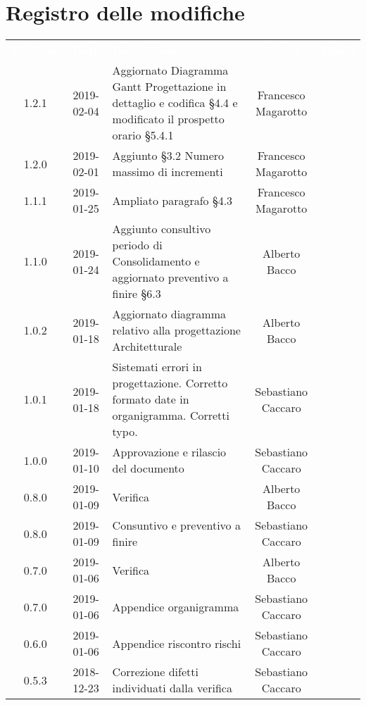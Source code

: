 \section*{Registro delle modifiche}
{
	\renewcommand{\arraystretch}{1.5}
	\centering
	\begin{longtable}{ c c  C{4cm}  c  c }
		
		\textcolor{white}{\textbf{Versione}} & \textcolor{white}{\textbf{Data}} & \textcolor{white}{\textbf{Descrizione}} & \textcolor{white}{\textbf{Autore}} & \textcolor{white}{\textbf{Ruolo}}\\
		1.2.1 & 2019-02-04 & Aggiornato Diagramma Gantt Progettazione in dettaglio e codifica §4.4 e modificato il prospetto orario §5.4.1 & Francesco Magarotto & \reda{}\\
		1.2.0 & 2019-02-01 & Aggiunto §3.2 Numero massimo di incrementi & Francesco Magarotto & \reda{}\\
		1.1.1 & 2019-01-25 & Ampliato paragrafo §4.3 & Francesco Magarotto & \reda{}\\
		1.1.0 & 2019-01-24 & Aggiunto consultivo periodo di Consolidamento  e aggiornato preventivo a finire §6.3 & Alberto Bacco & \Res{}\\
		1.0.2 & 2019-01-18 & Aggiornato diagramma relativo alla progettazione Architetturale & Alberto Bacco & \Res{} \\
				1.0.1 & 2019-01-18 & Sistemati errori in progettazione. Corretto formato date in organigramma. Corretti typo. & Sebastiano Caccaro & \reda{}\\	
		1.0.0 & 2019-01-10 & Approvazione e rilascio del documento & Sebastiano Caccaro & \Res{}\\		
		0.8.0 & 2019-01-09 & Verifica & Alberto Bacco & \ver{}\\		
		
		0.8.0 & 2019-01-09 & Consuntivo e preventivo a finire & Sebastiano Caccaro & \reda{}\\			
		
		0.7.0 & 2019-01-06 & Verifica & Alberto Bacco & \ver{}\\		
		
		0.7.0 & 2019-01-06 & Appendice organigramma & Sebastiano Caccaro & \reda{}\\		
		
		0.6.0 & 2019-01-06 & Appendice riscontro rischi & Sebastiano Caccaro & \reda{}\\
					
		0.5.3 & 2018-12-23 & Correzione difetti individuati dalla verifica & Sebastiano Caccaro & \reda{}\\		
		

\end{longtable}}

